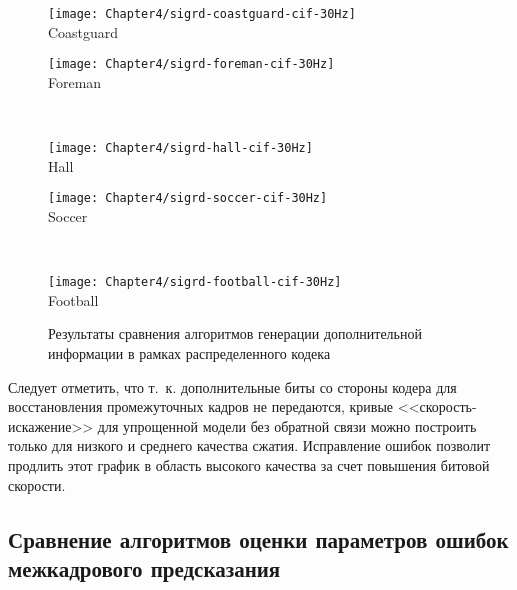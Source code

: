 \begin{figure}[htbp]
    \begin{center}
        \begin{minipage}{0.45\textwidth}
            \centering\texttt{[image: Chapter4/sigrd-coastguard-cif-30Hz]} \\ Coastguard
        \end{minipage}
        \begin{minipage}{0.45\textwidth}
            \centering\texttt{[image: Chapter4/sigrd-foreman-cif-30Hz]} \\ Foreman
        \end{minipage}
        \\
        \begin{minipage}{0.45\textwidth}
            \centering\texttt{[image: Chapter4/sigrd-hall-cif-30Hz]} \\ Hall
        \end{minipage}
        \begin{minipage}{0.45\textwidth}
            \centering\texttt{[image: Chapter4/sigrd-soccer-cif-30Hz]} \\ Soccer
        \end{minipage}
        \\
        \begin{minipage}{0.45\textwidth}
            \centering\texttt{[image: Chapter4/sigrd-football-cif-30Hz]} \\ Football
        \end{minipage}
    \end{center}
    \caption{Результаты сравнения алгоритмов генерации дополнительной информации в рамках распределенного кодека}
    \label{fig:ch3:RdSI}
\end{figure}

Следует отметить, что т.~к. дополнительные биты со стороны кодера для восстановления промежуточных кадров не передаются, кривые <<скорость-искажение>> для упрощенной модели без обратной связи можно построить только для низкого и среднего качества сжатия. Исправление ошибок позволит продлить этот график в область высокого качества за счет повышения битовой скорости.

\subsection{Сравнение алгоритмов оценки параметров ошибок межкадрового предсказания}
\label{chap:ExpResults:SchemeofExperiment:CNM}

